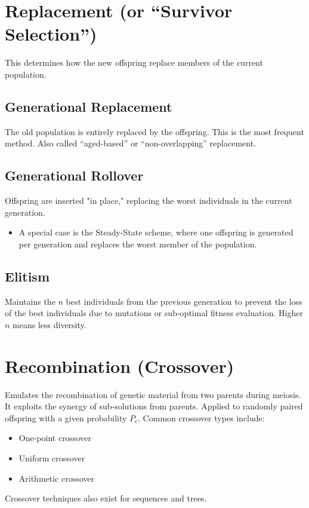 \section{Replacement (or “Survivor Selection”)}
This determines how the new offspring replace members of the current population.

\subsection*{Generational Replacement}
The old population is entirely replaced by the offspring.  This is the most frequent method. Also called “aged-based” or “non-overlapping” replacement.

\subsection*{Generational Rollover}
Offspring are inserted "in place," replacing the worst individuals in the current generation.
\begin{itemize}
    \item  A special case is the Steady-State scheme, where one offspring is generated per generation and replaces the worst member of the population.
\end{itemize}

\subsection*{Elitism}
Maintains the \(n\) best individuals from the previous generation to prevent the loss of the best individuals due to mutations or sub-optimal fitness evaluation.  Higher \(n\) means less diversity.

\section{Recombination (Crossover)}
Emulates the recombination of genetic material from two parents during meiosis. It exploits the synergy of sub-solutions from parents. Applied to randomly paired offspring with a given probability \(P_c\). Common crossover types include:
    \begin{itemize}
        \item One-point crossover
        \item  Uniform crossover
        \item  Arithmetic crossover
    \end{itemize}
    Crossover techniques also exist for sequences and trees.

